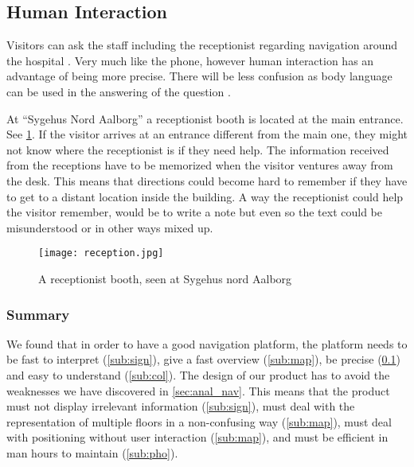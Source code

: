 \subsection{Human Interaction}\label{sub:human}
Visitors can ask the staff including the receptionist regarding navigation around the hospital \cite{job}. Very much like the phone, however human interaction has an advantage of being more precise. There will be less confusion as body language can be used in the answering of the question \cite{body_vs_phone}.

At \enquote{Sygehus Nord Aalborg} a receptionist booth is located at the main entrance. See \cref{fig:rec_booth}. If the visitor arrives at an entrance different from the main one, they might not know where the receptionist is if they need help. The information received from the receptions have to be memorized when the visitor ventures away from the desk. This means that directions could become hard to remember if they have to get to a distant location inside the building. A way the receptionist could help the visitor remember, would be to write a note but even so the text could be misunderstood or in other ways mixed up.

  \begin{figure}[ht!]
    \centering
    \texttt{[image: reception.jpg]}
    \caption{A receptionist booth, seen at Sygehus nord Aalborg}
    \label{fig:rec_booth}
  \end{figure}

\subsubsection{Summary} %
  We found that in order to have a good navigation platform, the platform needs to be fast to interpret (\cref{sub:sign}), give a fast overview (\cref{sub:map}), be precise (\cref{sub:human}) and easy to understand (\cref{sub:col}). The design of our product has to avoid the weaknesses we have discovered in \cref{sec:anal_nav}. This means that the product must not display irrelevant information (\cref{sub:sign}), must deal with the representation of multiple floors in a non-confusing way (\cref{sub:map}), must deal with positioning without user interaction (\cref{sub:map}), and must be efficient in man hours to maintain (\cref{sub:pho}).

